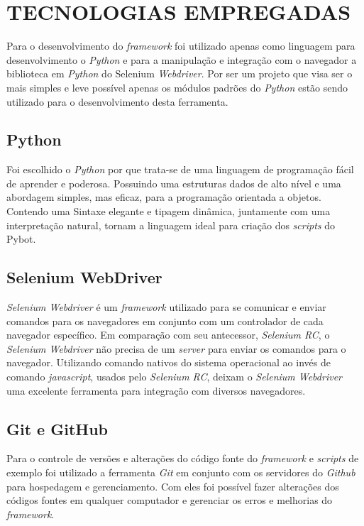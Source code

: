 %
%

\chapter{TECNOLOGIAS EMPREGADAS}\label{chap:tec}
        Para o desenvolvimento do \textit{framework} foi utilizado apenas como linguagem para desenvolvimento o \textit{Python}
        e para a manipulação e integração com o navegador a biblioteca em \textit{Python} do Selenium \textit{Webdriver}. Por ser um
        projeto que visa ser o mais simples e leve possível apenas os módulos padrões do \textit{Python} estão sendo utilizado
        para o desenvolvimento desta ferramenta.


        \section{Python}

            Foi escolhido o \textit{Python} \cite{Python} por que trata-se de uma linguagem de programação fácil de aprender e poderosa.
            Possuindo uma estruturas dados de alto nível e uma abordagem simples, mas eficaz, para a programação orientada
            a objetos. Contendo uma Sintaxe elegante e tipagem dinâmica, juntamente com uma interpretação natural, tornam
            a linguagem ideal para criação dos \textit{scripts} do Pybot.

        \section{Selenium WebDriver}
        \label{webdriver}
            \textit{Selenium Webdriver} \cite{webdriver} é um \textit{framework} utilizado para se comunicar e enviar comandos para os navegadores
            em conjunto com um controlador de cada navegador específico. Em comparação com seu antecessor, \textit{Selenium RC}, o \textit{Selenium Webdriver}
            não precisa de um \textit{server} para enviar os comandos para o navegador. Utilizando comando nativos do sistema operacional ao invés de
            comando \textit{javascript}, usados pelo \textit{Selenium RC}, deixam o \textit{Selenium Webdriver} uma excelente ferramenta para integração com diversos navegadores.

        \section{Git e GitHub}
            Para o controle de versões e alterações do código fonte do \textit{framework} e \textit{scripts} de exemplo foi utilizado a ferramenta
            \textit{Git} \cite{git} em conjunto com os servidores do \textit{Github} \cite{github} para hospedagem e gerenciamento. Com eles foi possível
            fazer alterações dos códigos fontes em qualquer computador e gerenciar os erros e melhorias do \textit{framework}.
